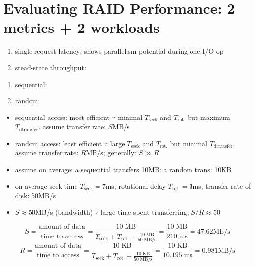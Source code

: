 \section*{Evaluating RAID Performance: 2 metrics + 2 workloads}
\begin{enumerate}
\item single-request latency: shows parallelism potential during one I/O op
\item stead-state throughput:
\end{enumerate}
\begin{enumerate}
\item sequential:
\item random:
\end{enumerate}
\begin{itemize}
\item sequential access: most efficient $\because$ minimal $T_{\text{seek}}$ and $T_{\text{rot.}}$ but maximum $T_{\text{dtransfer}}$. assume transfer rate: $S$MB/s
\item random access: least efficient $\because$ large $T_{\text{seek}}$ and $T_{\text{rot.}}$ but minimal $T_{\text{dtransfer}}$. assume transfer rate: $R$MB/s; generally: $S \gg R$
\item assume on average: a sequential transfers 10MB: a random trans: 10KB
\item on average seek time $T_{\text{seek}} = 7$ms, rotational delay $T_{\text{rot.}} = 3$ms, transfer rate of disk: 50MB/s
\item $S \approx 50$MB/s (bandwidth) $\because$ large time spent transferring; $S/R \approx 50$
\end{itemize}
\[
  S = \frac{\text{amount of data}}{\text{time to access}} = \frac{10\;\text{MB}}{T_{\text{seek}}+T_{\text{rot.}}+\frac{10\;\text{MB}}{50\;\text{MB/s}}} = \frac{10\;\text{MB}}{210\;\text{ms}} = 47.62\text{MB/s}
\]
\[
  R = \frac{\text{amount of data}}{\text{time to access}} = \frac{10\;\text{KB}}{T_{\text{seek}}+T_{\text{rot.}}+\frac{10\;\text{KB}}{50\;\text{MB/s}}} = \frac{10\;\text{KB}}{10.195\;\text{ms}} = 0.981\text{MB/s}
\]
